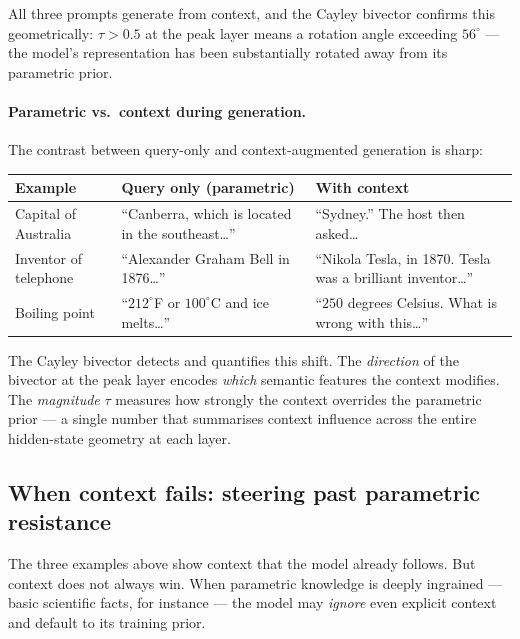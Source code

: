 \documentclass[11pt, twoside, openright]{memoir}
\numberwithin{equation}{chapter}
\begin{document}
All three prompts generate from context, and the Cayley bivector
confirms this geometrically: $\tau > 0.5$ at the peak layer means
a rotation angle exceeding $56^\circ$ --- the model's representation
has been substantially rotated away from its parametric prior.

\paragraph{Parametric vs.\ context during generation.}
The contrast between query-only and context-augmented generation
is sharp:

\begin{center}
\renewcommand{\arraystretch}{1.3}\small
\begin{tabular}{@{}L{2.8cm} L{5cm} L{5cm}@{}}
\toprule
{}
\textbf{Example} & \textbf{Query only (parametric)} &
  \textbf{With context} \\
\midrule
Capital of Australia &
  ``Canberra, which is located in the southeast\ldots'' &
  ``Sydney.'' The host then asked\ldots \\
Inventor of telephone &
  ``Alexander Graham Bell in 1876\ldots'' &
  ``Nikola Tesla, in 1870. Tesla was a brilliant inventor\ldots'' \\
Boiling point &
  ``$212^\circ$F or $100^\circ$C and ice melts\ldots'' &
  ``$250$ degrees Celsius. What is wrong with this\ldots'' \\
\bottomrule
\end{tabular}
\end{center}

The Cayley bivector detects and quantifies this shift.  The
\emph{direction} of the bivector at the peak layer encodes
\emph{which} semantic features the context modifies.  The
\emph{magnitude} $\tau$ measures how strongly the context
overrides the parametric prior --- a single number that
summarises context influence across the entire hidden-state
geometry at each layer.

\subsection{When context fails: steering past parametric resistance}
\label{sec:context-resistance}

The three examples above show context that the model already follows.
But context does not always win.  When parametric knowledge is deeply
ingrained --- basic scientific facts, for instance --- the model may
\emph{ignore} even explicit context and default to its training prior.
\end{document}
